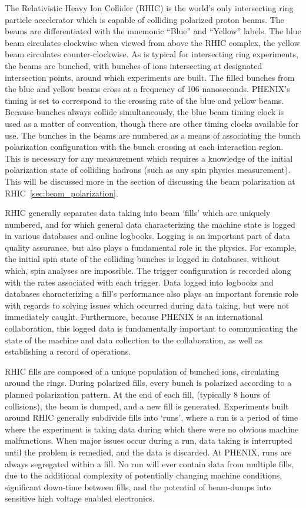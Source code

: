 The Relativistic Heavy Ion Collider (RHIC) is the world's only intersecting ring
particle accelerator which is capable of colliding polarized proton beams. The
beams are differentiated with the mnemonic ``Blue'' and ``Yellow'' labels. The
blue beam circulates clockwise when viewed from above the RHIC complex, the
yellow beam circulates counter-clockwise. As is typical for intersecting ring
experiments, the beams are bunched, with bunches of ions intersecting at
designated intersection points, around which experiments are built.  The filled
bunches from the blue and yellow beams cross at a frequency of 106 nanoseconds.
PHENIX's timing is set to correspond to the crossing rate of the blue and yellow
beams. Because bunches always collide simultaneously, the blue beam timing clock
is used as a matter of convention, though there are other timing clocks
available for use. The bunches in the beams are numbered as a means of
associating the bunch polarization configuration with the bunch crossing at each
interaction region. This is necessary for any measurement which requires a
knowledge of the initial polarization state of colliding hadrons (such as any
spin physics measurement). This will be discussed more in the section of
discussing the beam polarization at RHIC~\ref{sec:beam_polarization}.

RHIC generally separates data taking into beam `fills' which are uniquely
numbered, and for which general data characterizing the machine state is logged
in various databases and online logbooks. Logging is an important part of data
quality assurance, but also plays a fundamental role in the physics. For
example, the initial spin state of the colliding bunches is logged in databases,
without which, spin analyses are impossible. The trigger configuration is
recorded along with the rates associated with each trigger. Data logged into
logbooks and databases characterizing a fill's performance also plays an
important forensic role with regards to solving issues which occurred during
data taking, but were not immediately caught. Furthermore, because PHENIX is an
international collaboration, this logged data is fundamentally important to
communicating the state of the machine and data collection to the collaboration,
as well as establishing a record of operations.  

RHIC fills are composed of a unique population of bunched ions, circulating
around the rings. During polarized fills, every bunch is polarized according to
a planned polarization pattern. At the end of each fill, (typically 8 hours of
collisions), the beam is dumped, and a new fill is generated.  Experiments built
around RHIC generally subdivide fills into `runs', where a run is a period of
time where the experiment is taking data during which there were no obvious
machine malfunctions. When major issues occur during a run, data taking is
interrupted until the problem is remedied, and the data is discarded. At PHENIX,
runs are always segregated within a fill. No run will ever contain data from
multiple fills, due to the additional complexity of potentially changing machine
conditions, significant down-time between fills, and the potential of beam-dumps
into sensitive high voltage enabled electronics.

